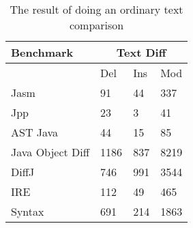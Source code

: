 \begin{table}[H]
    \centering
    \begin{tabular}{l|lll}
    Benchmark        & \multicolumn{3}{|c}{Text Diff} \\ \hline
    ~                & Del            & Ins & Mod  \\ \hline
    Jasm             & 91             & 44  & 337  \\
    Jpp              & 23             & 3   & 41   \\
    AST Java         & 44             & 15  & 85   \\
    Java Object Diff & 1186           & 837 & 8219 \\
    DiffJ            & 746            & 991 & 3544 \\
    IRE              & 112            & 49  & 465  \\
    Syntax           & 691            & 214 & 1863 \\
    \end{tabular}
    \caption{The result of doing an ordinary text comparison}
    \label{tab:textcomp}
\end{table}







